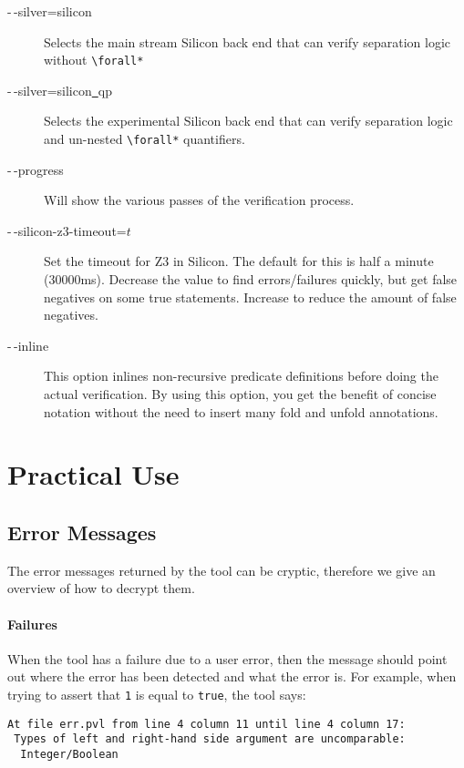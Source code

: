 \begin{description}
\item[-\,-silver=silicon] Selects the main stream Silicon back end that can verify separation logic without \lstinline+\forall*+
\item[-\,-silver=silicon\underline{~}qp] Selects the experimental Silicon back end that can verify separation logic
and un-nested \lstinline+\forall*+ quantifiers.
\item[-\,-progress] Will show the various passes of the verification process.
\item[-\,-silicon-z3-timeout=$t$] Set the timeout for Z3 in Silicon. The default for this is half a minute (30000ms).
Decrease the value to find errors/failures quickly, but get false negatives on some true statements.
Increase to reduce the amount of false negatives.
\item[-\,-inline] This option inlines non-recursive predicate definitions
before doing the actual verification. By using this option, you get
the benefit of concise notation without the need to insert many fold and unfold
annotations.
\end{description}

\section{Practical Use}

\subsection{Error Messages}

The error messages returned by the tool can be cryptic, therefore we
give an overview of how to decrypt them.

\paragraph{Failures}

When the tool has a failure due to a user error, then the message should point out where
the error has been detected and what the error is. For example, when trying to
assert that \verb+1+ is equal to \verb+true+, the tool says:
\begin{verbatim}
At file err.pvl from line 4 column 11 until line 4 column 17:
 Types of left and right-hand side argument are uncomparable:
  Integer/Boolean
\end{verbatim}

